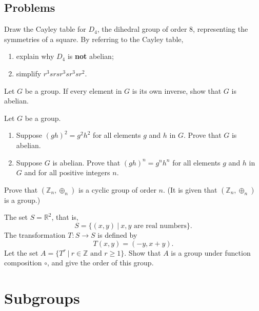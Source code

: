 \section{Problems}
\begin{problem}
    Draw the Cayley table for $D_4$, the dihedral group of order 8, representing the symmetries of a square. By referring to the Cayley table,
    \begin{enumerate}[label=(\alph*)]
        \item explain why $D_4$ is \textbf{not} abelian;
        \item simplify $r^3srsr^3sr^3sr^2$.
    \end{enumerate}
\end{problem}
\begin{problem}
    Let $G$ be a group. If every element in $G$ is its own inverse, show that $G$ is abelian.
\end{problem}

\begin{problem}
    Let $G$ be a group.
    \begin{enumerate}[label=(\alph*)]
        \item Suppose $(gh)^2 = g^2h^2$ for all elements $g$ and $h$ in $G$. Prove that $G$ is abelian.
        \item Suppose $G$ is abelian. Prove that $(gh)^n = g^nh^n$ for all elements $g$ and $h$ in $G$ and for all positive integers $n$.
    \end{enumerate}
\end{problem}

\begin{problem}
    Prove that $(\mathbb{Z}_n, \oplus_n)$ is a cyclic group of order $n$. (It is given that $(\mathbb{Z}_n, \oplus_n)$ is a group.)
\end{problem}

\begin{problem}
    The set $S = \mathbb{R}^2$, that is,
    \[
        S = \{(x, y) \ | \ x, y \text{ are real numbers}\}.
    \]
    The transformation $T: S \to S$ is defined by
    \[
        T(x, y) = (-y, x+y).
    \]
    Let the set $A = \{T^r \ | \ r \in \mathbb{Z} \text{ and } r \geq 1\}$. Show that $A$ is a group under function composition $\circ$, and give the order of this group.
\end{problem}

\chapter{Subgroups}
